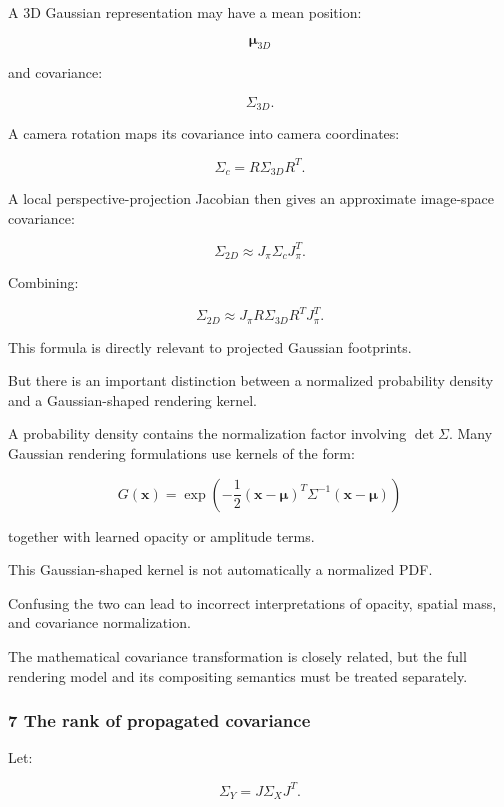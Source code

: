 \hypertarget{02-foundations-ii-ch024-the-connection-to-gaussian-splatting}{}

A 3D Gaussian representation may have a mean position:

\[
 \boldsymbol\mu_{3D}
\]

and covariance:

\[
 \Sigma_{3D}.
\]

A camera rotation maps its covariance into camera coordinates:

\[
 \Sigma_c=R\Sigma_{3D}R^T.
\]

A local perspective-projection Jacobian then gives an approximate image-space covariance:

\[
 \boxed{ \Sigma_{2D}\approx J_\pi\Sigma_cJ_\pi^T }.
\]

Combining:

\[
 \boxed{ \Sigma_{2D}\approx J_\pi R\Sigma_{3D}R^TJ_\pi^T }.
\]

This formula is directly relevant to projected Gaussian footprints.

But there is an important distinction between a normalized probability density and a Gaussian-shaped rendering kernel.

A probability density contains the normalization factor involving \(\det\Sigma\). Many Gaussian rendering formulations use kernels of the form:

\[
 G(\mathbf x)= \exp\left( -\frac12(\mathbf x-\boldsymbol\mu)^T \Sigma^{-1}(\mathbf x-\boldsymbol\mu) \right)
\]

together with learned opacity or amplitude terms.

This Gaussian-shaped kernel is not automatically a normalized PDF.

Confusing the two can lead to incorrect interpretations of opacity, spatial mass, and covariance normalization.

The mathematical covariance transformation is closely related, but the full rendering model and its compositing semantics must be treated separately.

\subsubsection{7 The rank of propagated covariance}\label{02-foundations-ii-ch024-the-rank-of-propagated-covariance}

\hypertarget{02-foundations-ii-ch024-the-rank-of-propagated-covariance}{}

Let:

\[
 \Sigma_Y=J\Sigma_XJ^T.
\]


